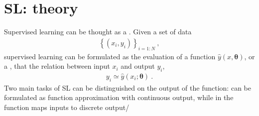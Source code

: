 \documentclass[letterpaper,10pt,english]{jupyterBook}
\begin{document}
\sphinxAtStartPar
{}

\sphinxstepscope


\section{SL: theory}
\label{\detokenize{ch/ml/sl-theory:sl-theory}}\label{\detokenize{ch/ml/sl-theory:ml-sl-theory}}\label{\detokenize{ch/ml/sl-theory::doc}}
\sphinxAtStartPar
Supervised learning can be thought as a . Given a set of data
\begin{equation*}
\begin{split}\left\{ (x_i, y_i) \right\}_{i=1:N} \ ,\end{split}
\end{equation*}
\sphinxAtStartPar
supervised learning can be formulated as the evaluation of a function \(\hat{y}(x, \boldsymbol{\theta})\), or a , that  the relation between input \(x_i\) and output \(y_i\),
\begin{equation*}
\begin{split}y_i \simeq \hat{y}\left( x_i; \boldsymbol{\theta} \right) \ .\end{split}
\end{equation*}
\sphinxAtStartPar
Two main tasks of SL can be distinguished on the output of the function:  can be formulated as function approximation with continuous output, while in  the function maps inputs to discrete output/
\end{document}
